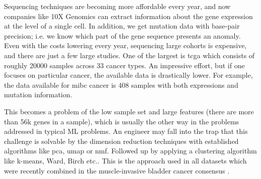 
Sequencing techniques are becoming more affordable every year, and now companies like 10X Genomics can extract information about the gene expression at the level of a single cell. In addition, we get mutation data with base-pair precision; i.e. we know which part of the gene sequence presents an anomaly. Even with the costs lowering every year, sequencing large cohorts is expensive, and there are just a few large studies. One of the largest is \acrshort{tcga}\cite{Tcga2018-sj} which consists of roughly 20000 samples across 33 cancer types. An impressive effort, but if one focuses on particular cancer, the available data is drastically lower. For example, the data available for \acrfull{mibc} cancer is 408 samples with both expressions and mutation information\cite{Robertson2017-mg}.  

This becomes a problem of the low sample set and large features (there are more than 56k genes in a sample), which is usually the other way in the problems addressed in typical ML problems. An engineer may fall into the trap that this challenge is solvable by the dimension reduction techniques with established algorithms like \acrfull{pca}, \acrfull{umap} or \acrfull{nmf}. Followed up by applying a clustering algorithm like k-means, Ward, Birch etc.. This is the approach used in all datasets which were recently combined in the muscle-invasive bladder cancer consensus \citet{Kamoun2020-tj}.

